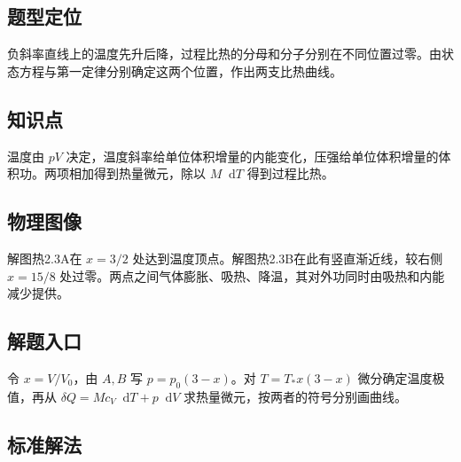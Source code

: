 \documentclass[UTF8,fontset=fandol,a4paper,11pt]{ctexart}
\newcommand{\dd}{\mathop{}\!\mathrm{d}}
\begin{document}


\subsection*{题型定位}

负斜率直线上的温度先升后降，过程比热的分母和分子分别在不同位置过零。由状态方程与第一定律分别确定这两个位置，作出两支比热曲线。



\subsection*{知识点}

温度由 $pV$ 决定，温度斜率给单位体积增量的内能变化，压强给单位体积增量的体积功。两项相加得到热量微元，除以 $M\dd T$ 得到过程比热。




\subsection*{物理图像}

解图热2.3A在 $x=3/2$ 处达到温度顶点。解图热2.3B在此有竖直渐近线，较右侧 $x=15/8$ 处过零。两点之间气体膨胀、吸热、降温，其对外功同时由吸热和内能减少提供。



\subsection*{解题入口}

令 $x=V/V_0$，由 $A,B$ 写 $p=p_0(3-x)$。对 $T=T_*x(3-x)$ 微分确定温度极值，再从 $\delta Q=Mc_V\dd T+p\dd V$ 求热量微元，按两者的符号分别画曲线。




\subsection*{标准解法}
\end{document}
